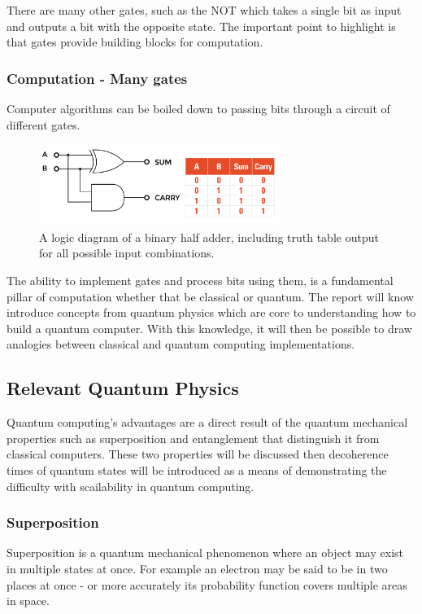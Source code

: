 There are many other gates, such as the NOT which takes a single bit as input and outputs a bit with the opposite state. The important point to highlight is that gates provide building blocks for computation.

\subsubsection{Computation - Many gates}
Computer algorithms can be boiled down to passing bits through a circuit of different gates. 
\begin{figure}[H]
    \centering
    \includegraphics[width=0.7\textwidth]{images/adder.jpeg}
    \caption{A logic diagram of a binary half adder, including truth table output for all possible input combinations. \cite{adder}}\label{fig:ADDER}
\end{figure}

 The ability to implement gates and process bits using them, is a fundamental pillar of computation whether that be classical or quantum. The report will know introduce concepts from quantum physics which are core to understanding how to build a quantum computer. With this knowledge, it will then be possible to draw analogies between classical and quantum computing implementations.

\subsection{Relevant Quantum Physics}

Quantum computing's advantages are a direct result of the quantum mechanical properties such as superposition and entanglement that distinguish it from classical computers. 
These two properties will be discussed then decoherence times of quantum states will be introduced as a means of demonstrating the difficulty with scailability in quantum computing. 


\subsubsection{Superposition}
Superposition is a quantum mechanical phenomenon where an object may exist in multiple states at once. 
For example an electron may be said to be in two places at once - or more accurately its probability function covers multiple areas in space. \cite{noauthor_whatCal_nodate}

